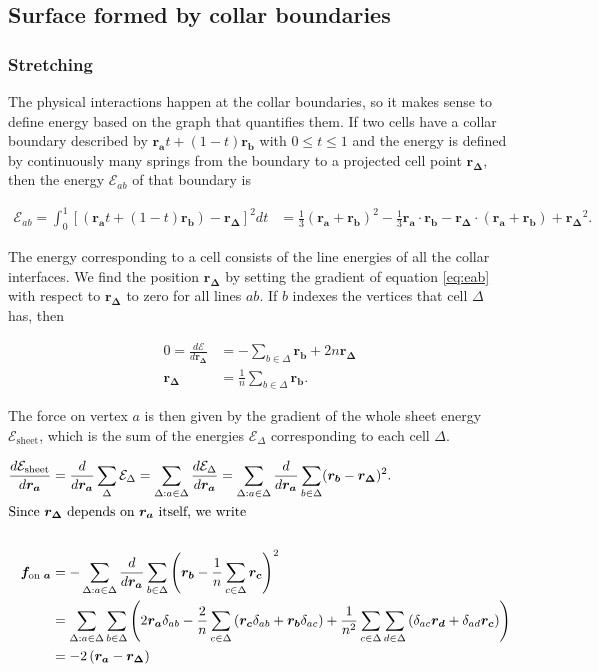 \documentclass[draft]{article}
\newcommand{\e}{\mathcal{E}}
\begin{document}
\subsection{Surface formed by collar boundaries}
\subsubsection{Stretching}

The physical interactions happen at the collar boundaries, so it makes sense to define energy based on the graph that quantifies them. If two cells have a collar boundary described by $\bm{r_a} t + (1-t)\bm{r_b}$ with $0 \leq t \leq 1$ and the energy is defined by continuously many springs from the boundary to a projected cell point $\bm{r_\Delta}$, then the energy $\e_{ab}$ of that boundary is 

\begin{align}
    \e_{ab} = \int_0^1 \left[(\bm{r_a}t + (1-t)\bm{r_b}) - \bm{r_\Delta} \right]^2 dt &= \frac{1}{3} (\bm{r_a} + \bm{r_b})^2 - \frac{1}{3} \bm{r_a}\cdot\bm{r_b} - \bm{r_\Delta} \cdot (\bm{r_a} + \bm{r_b}) + \bm{r_\Delta}^2. \label{eq:eab}
\end{align}

The energy corresponding to a cell consists of the line energies of all the collar interfaces. We find the position $\bm{r_\Delta}$ by setting the gradient of equation \ref{eq:eab} with respect to $\bm{r_\Delta}$ to zero for all lines $ab$. If $b$ indexes the vertices that cell $\Delta$ has, then 

\begin{align*}
    0 = \frac{d\e}{d\bm{r_\Delta}} &= -\sum_{b\in\Delta} \bm{r_b} + 2n\bm{r_\Delta} \\
    \bm{r_\Delta} &= \frac{1}{n} \sum_{b\in\Delta} \bm{r_b}.
\end{align*}

The force on vertex $a$ is then given by the gradient of the whole sheet energy $\e_{\text{sheet}}$, which is the sum of the energies $\e_\Delta$ corresponding to each cell $\Delta$. 

\begin{align*}
    \frac{d \e_{\text{sheet}}}{d\bm{r_a}} &= \frac{d}{d\bm{r_a}} \sum_\Delta \e_\Delta = \sum_{\Delta:a \in \Delta} \frac{d\e_\Delta}{d\bm{r_a}} = \sum_{\Delta:a\in\Delta} \frac{d}{d\bm{r_a}} \sum_{b \in \Delta} (\bm{r_b} - \bm{r_\Delta})^2. \\
    \intertext{Since $\bm{r_\Delta}$ depends on $\bm{r_a}$ itself, we write} \\
    \bm{f_{\text{on }a}} &= -\sum_{\Delta:a\in\Delta} \frac{d}{d\bm{r_a}} \sum_{b \in \Delta} \left(\bm{r_b} - \frac{1}{n} \sum_{c\in\Delta} \bm{r_c} \right)^2 \\
    &= \sum_{\Delta:a\in\Delta} \sum_{b \in \Delta} \left(2\bm{r_a}\delta_{ab} - \frac{2}{n} \sum_{c\in\Delta}\left(\bm{r_c}\delta_{ab} + \bm{r_b}\delta_{ac}\right) + \frac{1}{n^2} \sum_{c\in\Delta}\sum_{d\in\Delta} \left(\delta_{ac}\bm{r_d} + \delta_{ad}\bm{r_c} \right) \right) \\
    &= -2\left(\bm{r_a} - \bm{r_\Delta} \right)
\end{align*}
\end{document}
